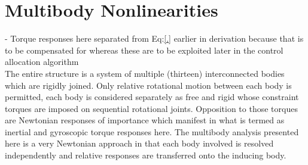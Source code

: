 \section{Multibody Nonlinearities}
\label{sec:dynamics.nonlinearities}
- Torque responses here separated from Eq:\ref{.} earlier in derivation because that is to be compensated for whereas these are to be exploited later in the control allocation algorithm
\\
The entire structure is a system of multiple (thirteen) interconnected bodies which are rigidly joined. Only relative rotational motion between each body is permitted, each body is considered separately as free and rigid whose constraint torques are imposed on sequential rotational joints. Opposition to those torques are Newtonian responses of importance which manifest in what is termed as inertial and gyroscopic torque responses here. The multibody analysis presented here is a very Newtonian approach in that each body involved is resolved independently and relative responses are transferred onto the inducing body.

